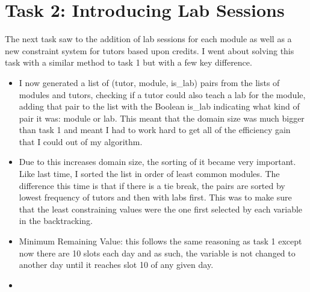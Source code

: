 \documentclass[conference]{IEEEtran}
\begin{document}
\section{Task 2: Introducing Lab Sessions}
The next task saw to the addition of lab sessions for each module as well as a new constraint system for tutors based upon credits. I went about solving this task with a similar method to task 1 but with a few key difference. 
\begin{itemize}
\item I now generated a list of (tutor, module, is\_lab) pairs from the lists of modules and tutors, checking if a tutor could also teach a lab for the module, adding that pair to the list with the Boolean is\_lab indicating what kind of pair it was: module or lab. This meant that the domain size was much bigger than task 1 and meant I had to work hard to get all of the efficiency gain that I could out of my algorithm.
\item Due to this increases domain size, the sorting of it became very important. Like last time, I sorted the list in order of least common modules. The difference this time is that if there is a tie break, the pairs are sorted by lowest frequency of tutors and then with labs first. This was to make sure that the least constraining values were the one first selected by each variable in the backtracking. 
\item Minimum Remaining Value: this follows the same reasoning as task 1 except now there are 10 slots each day and as such, the variable is not changed to another day until it reaches slot 10 of any given day.
\item  


\end{itemize}
\end{document}
